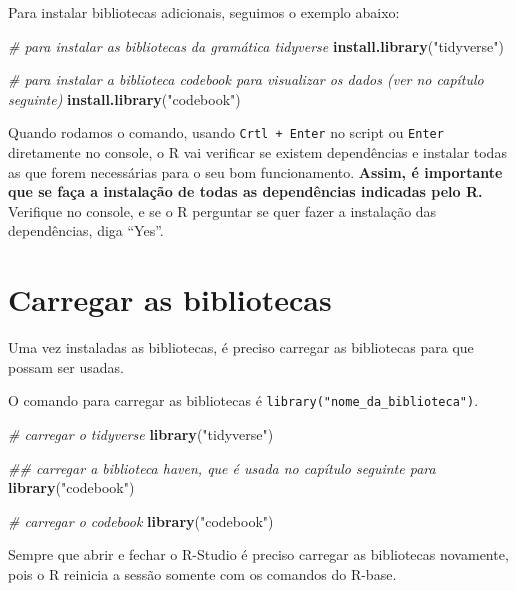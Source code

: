 \documentclass[
  brazil,
]{book}
\newenvironment{Shaded}{\begin{snugshade}}{\end{snugshade}}
\newcommand{\CommentTok}[1]{\textcolor[rgb]{0.56,0.35,0.01}{\textit{#1}}}
\newcommand{\KeywordTok}[1]{\textcolor[rgb]{0.13,0.29,0.53}{\textbf{#1}}}
\newcommand{\NormalTok}[1]{#1}
\newcommand{\StringTok}[1]{\textcolor[rgb]{0.31,0.60,0.02}{#1}}
\begin{document}
Para instalar bibliotecas adicionais, seguimos o exemplo abaixo:

\begin{Shaded}
\begin{Highlighting}[]
\CommentTok{# para instalar as bibliotecas da gramática tidyverse}
\KeywordTok{install.library}\NormalTok{(}\StringTok{"tidyverse"}\NormalTok{)}

\CommentTok{# para instalar a biblioteca codebook para visualizar os dados (ver no capítulo seguinte)}
\KeywordTok{install.library}\NormalTok{(}\StringTok{"codebook"}\NormalTok{)}
\end{Highlighting}
\end{Shaded}

Quando rodamos o comando, usando \texttt{Crtl\ +\ Enter} no script ou \texttt{Enter} diretamente no console, o R vai verificar se existem dependências e instalar todas as que forem necessárias para o seu bom funcionamento. \textbf{Assim, é importante que se faça a instalação de todas as dependências indicadas pelo R.} Verifique no console, e se o R perguntar se quer fazer a instalação das dependências, diga ``Yes''.

\hypertarget{carregar-as-bibliotecas}{%
\section{Carregar as bibliotecas}\label{carregar-as-bibliotecas}}

Uma vez instaladas as bibliotecas, é preciso carregar as bibliotecas para que possam ser usadas.

O comando para carregar as bibliotecas é \texttt{library("nome\_da\_biblioteca")}.

\begin{Shaded}
\begin{Highlighting}[]
\CommentTok{# carregar o tidyverse}
\KeywordTok{library}\NormalTok{(}\StringTok{"tidyverse"}\NormalTok{)}

\CommentTok{## carregar a biblioteca haven, que é usada no capítulo seguinte para }
\KeywordTok{library}\NormalTok{(}\StringTok{"codebook"}\NormalTok{)}

\CommentTok{# carregar o codebook}
\KeywordTok{library}\NormalTok{(}\StringTok{"codebook"}\NormalTok{)}
\end{Highlighting}
\end{Shaded}

Sempre que abrir e fechar o R-Studio é preciso carregar as bibliotecas novamente, pois o R reinicia a sessão somente com os comandos do R-base.
\end{document}
